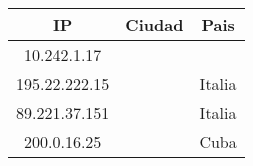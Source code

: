 \begin{tabular}{|c|c|c|}
	\hline
	IP & Ciudad & Pais \\
	\hline
	10.242.1.17 & &  \\
	\hline
	195.22.222.15 & & Italia  \\
	\hline
	89.221.37.151 & & Italia \\
	\hline
	200.0.16.25 & & Cuba \\
	\hline
\end{tabular}
